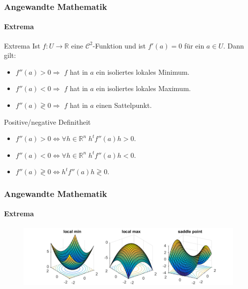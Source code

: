 \documentclass{beamer}
\begin{document}
\begin{frame}
    \frametitle{Angewandte Mathematik}
\framesubtitle{Extrema}
    \begin{block}{Extrema}
 Ist $f: U  \to \mathbb{R}$ eine $\mathcal{C}^2$-Funktion und ist $f'(a) = 0$ für ein $a \in U$. Dann gilt:
\begin{itemize}
\item $f''(a) > 0 \Rightarrow $ $f$ hat in $a$ ein isoliertes lokales Minimum.
\item $f''(a) < 0 \Rightarrow $ $f$ hat in $a$ ein isoliertes lokales Maximum.
\item $f''(a) \gtrless 0 \Rightarrow $ $f$ hat in $a$ einen Sattelpunkt.
\end{itemize} 
\end{block}

\begin{block}{Positive/negative Definitheit}
   \begin{itemize}
   \item $f''(a) > 0 \Leftrightarrow \forall h \in \mathbb{R}^n \; h^t f''(a) h > 0$.
   \item $f''(a) < 0 \Leftrightarrow \forall h \in \mathbb{R}^n \; h^t f''(a) h < 0$.
   \item $f''(a) \gtrless 0 \Leftrightarrow h^t f''(a) h \gtrless 0$.
   \end{itemize} 
   \end{block}

 \end{frame}

 \begin{frame}
    \frametitle{Angewandte Mathematik}
\framesubtitle{Extrema}
 \begin{figure}[H]
    \centering
  \includegraphics[width=1.0\textwidth]{images/minmaxsaddle.png}
\end{figure}
\end{frame}
\end{document}
